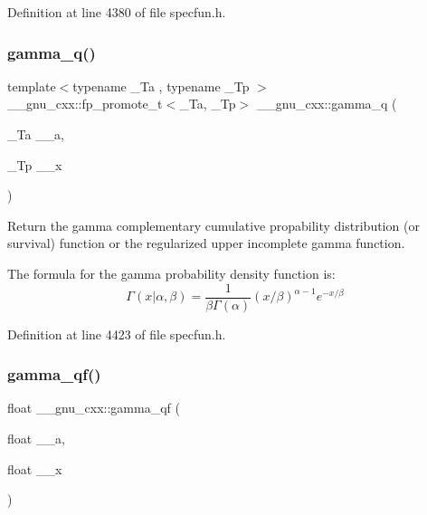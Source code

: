Definition at line 4380 of file specfun.\+h.

\mbox{\label{group__gnu__math__spec__func_ga10c246b2fa2ce000dc5d7c81e9e98c58}} 
\subsubsection{\texorpdfstring{gamma\+\_\+q()}{gamma\_q()}}
{\footnotesize\ttfamily template$<$typename \+\_\+\+Ta , typename \+\_\+\+Tp $>$ \\
\+\_\+\+\_\+gnu\+\_\+cxx\+::fp\+\_\+promote\+\_\+t$<$\+\_\+\+Ta, \+\_\+\+Tp$>$ \+\_\+\+\_\+gnu\+\_\+cxx\+::gamma\+\_\+q (\begin{DoxyParamCaption}\item[{\+\_\+\+Ta}]{\+\_\+\+\_\+a,  }\item[{\+\_\+\+Tp}]{\+\_\+\+\_\+x }\end{DoxyParamCaption})\hspace{0.3cm}{\ttfamily [inline]}}



Return the gamma complementary cumulative propability distribution (or survival) function or the regularized upper incomplete gamma function. 

The formula for the gamma probability density function is\+: \[ \Gamma(x|\alpha,\beta) = \frac{1}{\beta\Gamma(\alpha)} (x/\beta)^{\alpha - 1} e^{-x/\beta} \] 

Definition at line 4423 of file specfun.\+h.

\mbox{\label{group__gnu__math__spec__func_ga3ee8d2c40b904952538709cbb0e664a4}} 
\subsubsection{\texorpdfstring{gamma\+\_\+qf()}{gamma\_qf()}}
{\footnotesize\ttfamily float \+\_\+\+\_\+gnu\+\_\+cxx\+::gamma\+\_\+qf (\begin{DoxyParamCaption}\item[{float}]{\+\_\+\+\_\+a,  }\item[{float}]{\+\_\+\+\_\+x }\end{DoxyParamCaption})\hspace{0.3cm}{\ttfamily [inline]}}



